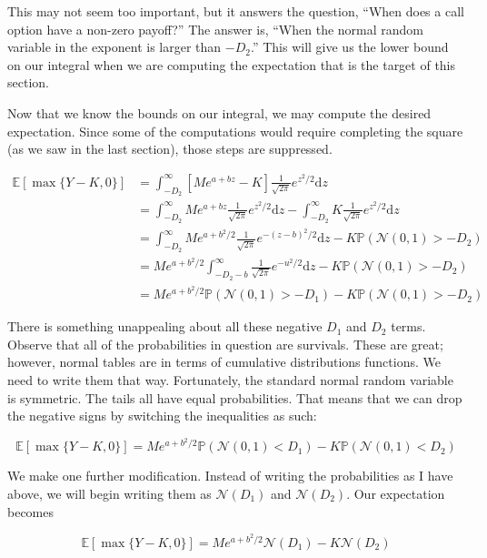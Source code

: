 \documentclass{ximera}
\begin{document}
This may not seem too important, but it answers the question, ``When does a call option have a non-zero payoff?'' The answer is, ``When the normal random variable in the exponent is larger than $-D_2$.'' This will give us the lower bound on our integral when we are computing the expectation that is the target of this section. 

Now that we know the bounds on our integral, we may compute the desired expectation. Since some of the computations would require completing the square (as we saw in the last section), those steps are suppressed. 

\begin{align*}
\mathbb{E}[\max\{Y-K,0\}] 	&=\int_{-D_2}^\infty [Me^{a+bz}-K]\frac{1}{\sqrt{2\pi}}e^{z^2/2}\mathrm{d}z\\
					&=\int_{-D_2}^\infty Me^{a+bz}\frac{1}{\sqrt{2\pi}}e^{z^2/2}\mathrm{d}z-\int_{-D_2}^\infty K\frac{1}{\sqrt{2\pi}}e^{z^2/2}\mathrm{d}z\\
					&=\int_{-D_2}^\infty Me^{a+b^2/2}\frac{1}{\sqrt{2\pi}}e^{-(z-b)^2/2}\mathrm{d}z -K\mathbb{P}(\mathcal{N}(0,1)>-D_2)\\
					&=Me^{a+b^2/2}\int_{-D_2-b}^\infty\frac{1}{\sqrt{2\pi}}e^{-u^2/2}\mathrm{d}z-K\mathbb{P}(\mathcal{N}(0,1)>-D_2)\\
					&=Me^{a+b^2/2}\mathbb{P}(\mathcal{N}(0,1)>-D_1)-K\mathbb{P}(\mathcal{N}(0,1)>-D_2)
\end{align*}

There is something unappealing about all these negative $D_1$ and $D_2$ terms. Observe that all of the probabilities in question are survivals. These are great; however, normal tables are in terms of cumulative distributions functions. We need to write them that way. Fortunately, the standard normal random variable is symmetric. The tails all have equal probabilities. That means that we can drop the negative signs by switching the inequalities as such:

\begin{equation*}
\mathbb{E}[\max\{Y-K,0\}]=Me^{a+b^2/2}\mathbb{P}(\mathcal{N}(0,1)<D_1)-K\mathbb{P}(\mathcal{N}(0,1)<D_2)
\end{equation*}

We make one further modification. Instead of writing the probabilities as I have above, we will begin writing them as $\mathcal{N}(D_1)$ and $\mathcal{N}(D_2)$. Our expectation becomes

\begin{equation*}
\mathbb{E}[\max\{Y-K,0\}]=Me^{a+b^2/2}\mathcal{N}(D_1)-K\mathcal{N}(D_2)
\end{equation*}
\end{document}
